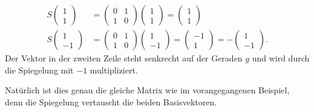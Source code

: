 \begin{align*}
S
\begin{pmatrix}1\\1\end{pmatrix}
&=
\begin{pmatrix}0&1\\1&0\end{pmatrix}
\begin{pmatrix}1\\1\end{pmatrix}
=
\begin{pmatrix}1\\1\end{pmatrix}
\\
S
\begin{pmatrix}1\\-1\end{pmatrix}
&=
\begin{pmatrix}0&1\\1&0\end{pmatrix}
\begin{pmatrix}1\\-1\end{pmatrix}
=
\begin{pmatrix}-1\\1\end{pmatrix}
=
-
\begin{pmatrix}1\\-1\end{pmatrix}.
\end{align*}
Der Vektor in der zweiten Zeile steht senkrecht auf der Geraden $g$ 
und wird durch die Spiegelung mit $-1$ multipliziert.

Natürlich ist dies genau die gleiche Matrix wie im vorangegangenen
Beispiel, denn die Spiegelung vertauscht die beiden Basisvektoren.

